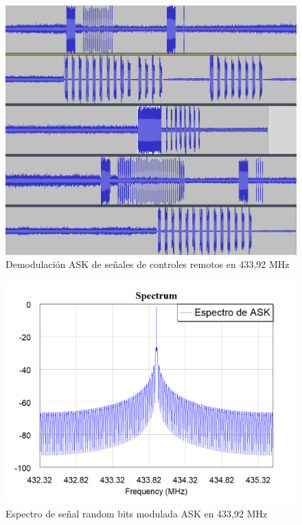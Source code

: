 \documentclass[12pt]{report}
\begin{document}
\begin{figure}[htb]
	\centering
	\includegraphics[scale=0.4]{llaves.png}
	\caption{Demodulación ASK de señales de controles remotos en 433,92 MHz}
	\label{llaves}
\end{figure}

\begin{figure}[htb]
	\centering
	\includegraphics[scale=0.4]{espectro_ASK.png}
	\caption{Espectro de señal random bits modulada ASK en 433,92 MHz }
	\label{espectro_ASK}
\end{figure}
\end{document}
